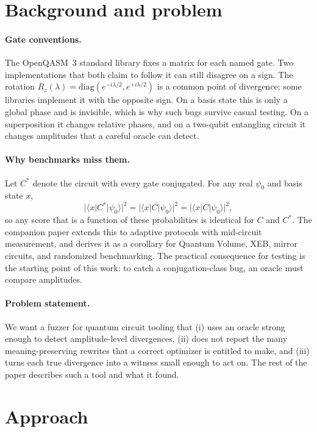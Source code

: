 \documentclass[11pt]{article}
\newcommand{\ket}[1]{\lvert #1 \rangle}
\newcommand{\bra}[1]{\langle #1 \rvert}
\begin{document}
\section{Background and problem}

\paragraph{Gate conventions.}
The OpenQASM~3 standard library fixes a matrix for each named gate. Two
implementations that both claim to follow it can still disagree on a
sign. The rotation $R_z(\lambda) = \mathrm{diag}(e^{-i\lambda/2},
e^{+i\lambda/2})$ is a common point of divergence; some libraries
implement it with the opposite sign. On a basis state this is only a
global phase and is invisible, which is why such bugs survive casual
testing. On a superposition it changes relative phases, and on a
two-qubit entangling circuit it changes amplitudes that a careful oracle
can detect.

\paragraph{Why benchmarks miss them.}
Let $C^*$ denote the circuit with every gate conjugated. For any real
$\psi_0$ and basis state $x$,
\[
\lvert \bra{x} C^* \ket{\psi_0} \rvert^2
= \lvert \overline{\bra{x} C \ket{\psi_0}} \rvert^2
= \lvert \bra{x} C \ket{\psi_0} \rvert^2 ,
\]
so any score that is a function of these probabilities is identical for
$C$ and $C^*$. The companion paper extends this to adaptive protocols
with mid-circuit measurement, and derives it as a corollary for Quantum
Volume, XEB, mirror circuits, and randomized benchmarking. The practical
consequence for testing is the starting point of this work: to catch a
conjugation-class bug, an oracle must compare amplitudes.

\paragraph{Problem statement.}
We want a fuzzer for quantum circuit tooling that (i) uses an oracle
strong enough to detect amplitude-level divergences, (ii) does not report
the many meaning-preserving rewrites that a correct optimizer is entitled
to make, and (iii) turns each true divergence into a witness small enough
to act on. The rest of the paper describes such a tool and what it found.

\section{Approach}
\end{document}
